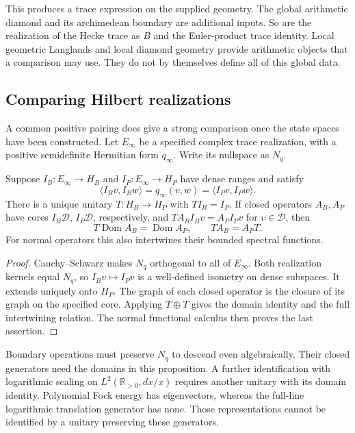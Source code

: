 This produces a trace expression on the supplied geometry. The global
arithmetic diamond and its archimedean boundary are additional inputs. So
are the realization of the Hecke trace as \(B\) and the Euler-product trace
identity. Local geometric Langlands and local diamond geometry provide
arithmetic objects that a comparison may use. They do not by themselves
define all of this global data.

\subsection{Comparing Hilbert realizations}

A common positive pairing does give a strong comparison once the state
spaces have been constructed. Let \(E_\infty\) be a specified complex trace
realization, with a positive semidefinite Hermitian form \(q_\infty\). Write
its nullspace as \(N_q\).

\begin{proposition}
\label{v4-arith:cs:prop:hilbert-transport}
Suppose \(I_B:E_\infty\to H_B\) and \(I_P:E_\infty\to H_P\) have dense
ranges and satisfy
\[
 \langle I_Bv,I_Bw\rangle
   =q_\infty(v,w)
   =\langle I_Pv,I_Pw\rangle.
\]
There is a unique unitary \(T:H_B\to H_P\) with \(TI_B=I_P\). If closed
operators \(A_B,A_P\) have cores \(I_B\mathcal D\), \(I_P\mathcal D\),
respectively, and \(TA_BI_Bv=A_PI_Pv\) for \(v\in\mathcal D\), then
\[
 T\operatorname{Dom}A_B
        =\operatorname{Dom}A_P,
 \qquad TA_B=A_PT.
\]
For normal operators this also intertwines their bounded spectral functions.
\end{proposition}

\begin{proof}
Cauchy--Schwarz makes \(N_q\) orthogonal to all of \(E_\infty\). Both
realization kernels equal \(N_q\), so \(I_Bv\mapsto I_Pv\) is a well-defined
isometry on dense subspaces. It extends uniquely onto \(H_P\). The graph of
each closed operator is the closure of its graph on the specified core.
Applying \(T\oplus T\) gives the domain identity and the full intertwining
relation. The normal functional calculus then proves the last assertion.
\end{proof}

Boundary operations must preserve \(N_q\) to descend even algebraically.
Their closed generators need the domains in this proposition. A further
identification with logarithmic scaling on \(L^2(\mathbb R_{>0},dx/x)\)
requires another unitary with its domain identity. Polynomial Fock energy
has eigenvectors, whereas the full-line logarithmic translation generator
has none. Those representations cannot be identified by a unitary preserving
these generators.

